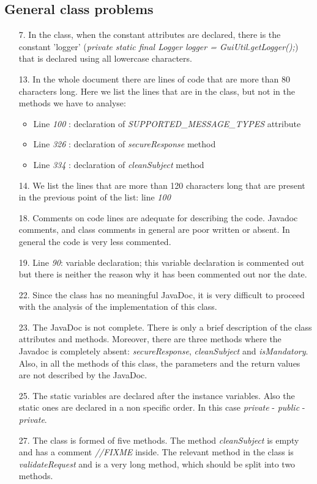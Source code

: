 \subsection{General class problems}
\label{ref-general}

\begin{itemize}
    \item[7.] 
        In the class, when the constant attributes are declared, there is the constant 'logger' (\textit{private static final Logger logger = GuiUtil.getLogger();}) that is declared using all lowercase characters.
    \item[13.] 
        In the whole document there are lines of code that are more than 80 characters long. 
        \newline
        Here we list the lines that are in the class, but not in the methods we have to analyse:
            \begin{itemize}
                \item Line \textit{100} : declaration of \textit{SUPPORTED\_MESSAGE\_TYPES} attribute
                \item Line \textit{326} : declaration of \textit{secureResponse} method
                \item Line \textit{334} : declaration of \textit{cleanSubject} method
            \end{itemize}
    \item[14.] 
        We list the lines that are more than 120 characters long that are present in the previous point of the list: line \textit{100}
    \item[18.] 
        Comments on code lines are adequate for describing the code. Javadoc comments, and class comments in general are poor written or absent. In general the code is very less commented.
    \item[19.] 
        Line \textit{90}: variable declaration; this variable declaration is commented out but there is neither the reason why it has been commented out nor the date.
    \item[22.] 
        Since the class has no meaningful JavaDoc, it is very difficult to proceed with the analysis of the implementation of this class.
    \item[23.] 
        The JavaDoc is not complete. There is only a brief description of the class attributes and methods. Moreover, there are three methods where the Javadoc is completely absent: \textit{secureResponse}, \textit{cleanSubject} and \textit{isMandatory}. Also, in all the methods of this class, the parameters and the return values are not described by the JavaDoc.
    \item[25.] 
        The static variables are declared after the instance variables. Also the static ones are declared in a non specific order. In this case \textit{private} - \textit{public} - \textit{private}. 
    \item[27.] 
        The class is formed of five methods. The method \textit{cleanSubject} is empty and has a comment \textit{//FIXME} inside. The relevant method in the class is \textit{validateRequest} and is a very long method, which should be split into two methods.
\end{itemize}